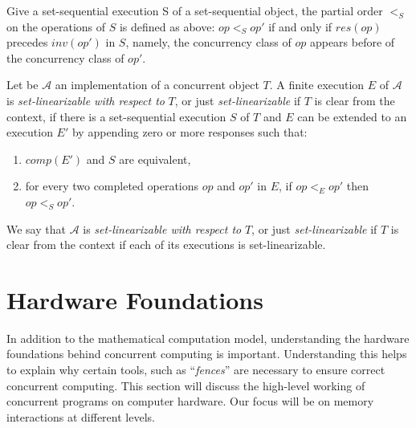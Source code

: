 Give a set-sequential execution S of a set-sequential object, the partial order \(<_S\) on the operations of \(S\) is defined as above: \(op <_S op'\) if and only if \(res(op)\) precedes \(inv(op')\) in \(S\), namely, the concurrency class of \(op\) appears before of the concurrency class of \(op'\).


\begin{definition}
    Let be \(\mathcal{A}\) an implementation of a concurrent object \(T\). A finite execution \(E\) of \(\mathcal{A}\) is \emph{set-linearizable with respect to} \(T\), or just \emph{set-linearizable} if \(T\) is clear from the context, if there is a set-sequential execution \(S\) of \(T\) and \(E\) can be extended to an execution \(E'\) by appending zero or more responses such that:

    \begin{enumerate}
        \item \(comp(E')\) and \(S\) are equivalent,
        \item for every two completed operations \(op\) and \(op'\) in \(E\), if \(op <_E op'\) then \(op <_S op'\).
    \end{enumerate}

    We say that \(\mathcal{A}\) is \emph{set-linearizable with respect to} \(T\), or just \emph{set-linearizable} if \(T\) is clear from the context if each of its executions is set-linearizable.
\end{definition}

\section{\label{sec:hardware-foundations}Hardware Foundations}

In addition to the mathematical computation model, understanding the hardware foundations behind concurrent computing is important. Understanding this helps to explain why certain tools, such as ``\emph{fences}'' are necessary to ensure correct concurrent computing. This section will discuss the high-level working of concurrent programs on computer hardware. Our focus will be on memory interactions at different levels. 


